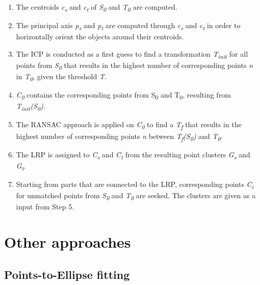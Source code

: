 \documentclass[a4paper,english,11pt]{report}
\begin{document}
\begin{enumerate}
	\item The centroids \textit{c\textsubscript{s}} and \textit{c\textsubscript{t}} of \textit{S\textsubscript{0}} and \textit{T\textsubscript{0}} are computed.
	
	\item The principal axis \textit{p\textsubscript{s}} and \textit{p\textsubscript{t}}  are computed through \textit{c\textsubscript{s}} and \textit{c\textsubscript{t}} in order to horizontally orient the objects around their centroids.
	
	\item The ICP is conducted as a first guess to find a transformation \textit{T\textsubscript{init}} for all points from \textit{S\textsubscript{0}} that results in the highest number of corresponding points \textit{n} in \textit{T\textsubscript{0}}, given the threshold \textit{T}.
	
	\item \textit{C\textsubscript{0}} contains the corresponding points from S\textsubscript{0} and T\textsubscript{0}, resulting from \textit{T\textsubscript{init}(S\textsubscript{0})}.
	
	\item The RANSAC approach is applied on \textit{C\textsubscript{0}} to find a  \textit{T\textsubscript{f}} that results in the highest number of corresponding points \textit{n} between \textit{T\textsubscript{f}(S\textsubscript{0})} and \textit{T\textsubscript{0}}.
	
	\item The LRP is assigned to \textit{C\textsubscript{s}} and \textit{C\textsubscript{t}} from the resulting point clusters \textit{G\textsubscript{s}} and \textit{G\textsubscript{t}}.
	
	\item Starting from parts that are connected to the LRP, corresponding points \textit{C\textsubscript{i}} for unmatched points from \textit{S\textsubscript{0}} and \textit{T\textsubscript{0}} are seeked. The clusters are given as a input from Step 5. 
	
\end{enumerate}

\section{Other approaches}

\subsection{Points-to-Ellipse fitting}
\end{document}
